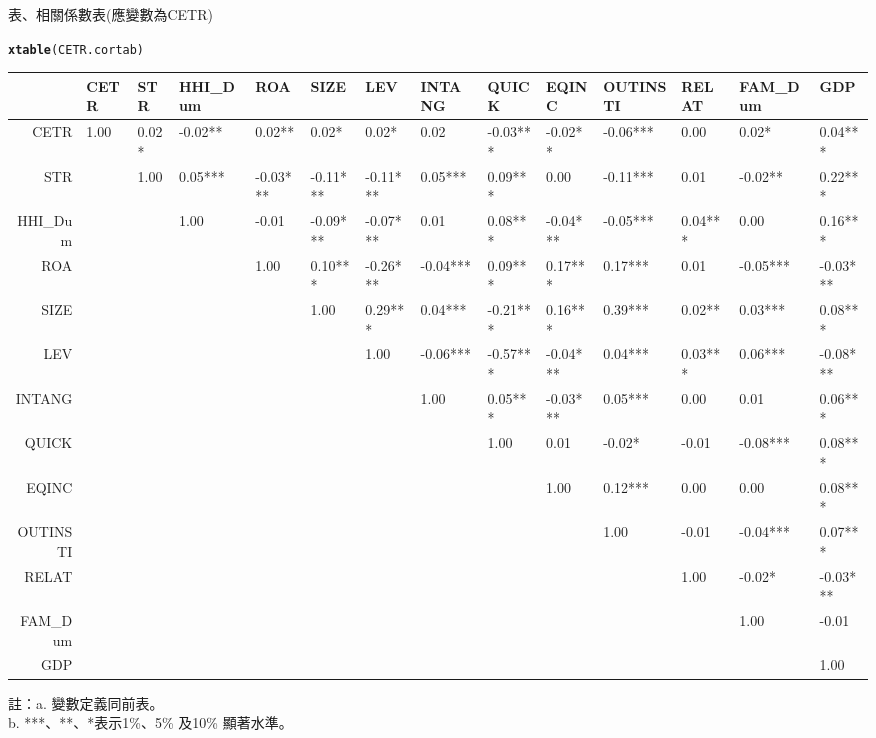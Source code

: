 \documentclass[a4paper,14pt]{article}\usepackage[]{graphicx}\usepackage[]{color}
\makeatletter
\newcommand{\hlstd}[1]{\textcolor[rgb]{0.345,0.345,0.345}{#1}}%
\newcommand{\hlkwd}[1]{\textcolor[rgb]{0.737,0.353,0.396}{\textbf{#1}}}%
\newenvironment{kframe}{%
 \def\at@end@of@kframe{}%
 \ifinner\ifhmode%
  \def\at@end@of@kframe{\end{minipage}}%
  \begin{minipage}{\columnwidth}%
 \fi\fi%
 \def\FrameCommand##1{\hskip\@totalleftmargin \hskip-\fboxsep
 \colorbox{shadecolor}{##1}\hskip-\fboxsep
     \hskip-\linewidth \hskip-\@totalleftmargin \hskip\columnwidth}%
 \MakeFramed {\advance\hsize-\width
   \@totalleftmargin\z@ \linewidth\hsize
   \@setminipage}}%
 {\par\unskip\endMakeFramed%
 \at@end@of@kframe}
\makeatother
\begin{document}
\newpage
\begin{landscape}
\centerline{表、相關係數表(應變數為CETR)}
\begin{kframe}
\begin{alltt}
\hlkwd{xtable}\hlstd{(CETR.cortab)}
\end{alltt}
\end{kframe}%
\begin{table}[ht]
\centering
\begin{tabular}{rlllllllllllll}
  \hline
 & CETR & STR & HHI\_Dum & ROA & SIZE & LEV & INTANG & QUICK & EQINC & OUTINSTI & RELAT & FAM\_Dum & GDP \\ 
  \hline
CETR &  1.00  &  0.02*   & -0.02**  &  0.02**  &  0.02*   &  0.02*   &  0.02    & -0.03*** & -0.02**  & -0.06*** &  0.00    &  0.02*   &  0.04*** \\ 
  STR &  &  1.00  &  0.05*** & -0.03*** & -0.11*** & -0.11*** &  0.05*** &  0.09*** &  0.00    & -0.11*** &  0.01    & -0.02**  &  0.22*** \\ 
  HHI\_Dum &  &  &  1.00  & -0.01    & -0.09*** & -0.07*** &  0.01    &  0.08*** & -0.04*** & -0.05*** &  0.04*** &  0.00    &  0.16*** \\ 
  ROA &  &  &  &  1.00  &  0.10*** & -0.26*** & -0.04*** &  0.09*** &  0.17*** &  0.17*** &  0.01    & -0.05*** & -0.03*** \\ 
  SIZE &  &  &  &  &  1.00  &  0.29*** &  0.04*** & -0.21*** &  0.16*** &  0.39*** &  0.02**  &  0.03*** &  0.08*** \\ 
  LEV &  &  &  &  &  &  1.00  & -0.06*** & -0.57*** & -0.04*** &  0.04*** &  0.03*** &  0.06*** & -0.08*** \\ 
  INTANG &  &  &  &  &  &  &  1.00  &  0.05*** & -0.03*** &  0.05*** &  0.00    &  0.01    &  0.06*** \\ 
  QUICK &  &  &  &  &  &  &  &  1.00  &  0.01    & -0.02*   & -0.01    & -0.08*** &  0.08*** \\ 
  EQINC &  &  &  &  &  &  &  &  &  1.00  &  0.12*** &  0.00    &  0.00    &  0.08*** \\ 
  OUTINSTI &  &  &  &  &  &  &  &  &  &  1.00  & -0.01    & -0.04*** &  0.07*** \\ 
  RELAT &  &  &  &  &  &  &  &  &  &  &  1.00  & -0.02*   & -0.03*** \\ 
  FAM\_Dum &  &  &  &  &  &  &  &  &  &  &  &  1.00  & -0.01    \\ 
  GDP &  &  &  &  &  &  &  &  &  &  &  &  &  1.00  \\ 
   \hline
\end{tabular}
\end{table}

註：a. 變數定義同前表。\\
    b. ***、**、*表示1\%、5\% 及10\% 顯著水準。\\

\end{landscape}
\end{document}
